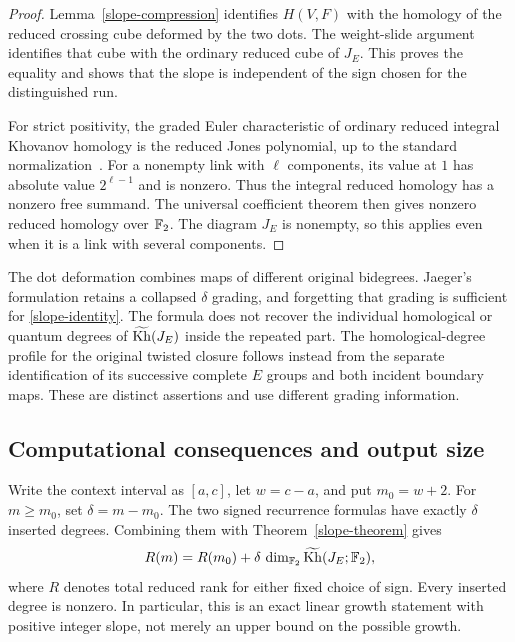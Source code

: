 \begin{proof}
Lemma~\ref{slope-compression} identifies $H(V,F)$ with the homology of the
reduced crossing cube deformed by the two dots. The weight-slide argument
identifies that cube with the ordinary reduced cube of $J_E$. This proves
the equality and shows that the slope is independent of the sign chosen
for the distinguished run.

For strict positivity, the graded Euler characteristic of ordinary reduced
integral Khovanov homology is the reduced Jones polynomial, up to the
standard normalization~\cite{bn05}. For a nonempty link with $\ell$
components, its value at $1$ has absolute value $2^{\ell-1}$ and is
nonzero. Thus the integral reduced homology has a nonzero free summand.
The universal coefficient theorem then gives nonzero reduced homology
over $\mathbb F_2$. The diagram $J_E$ is nonempty, so this applies even when it is
a link with several components.
\end{proof}

\begin{remark}\label{slope-grading}
The dot deformation combines maps of different original bidegrees.
Jaeger's formulation retains a collapsed $\delta$ grading, and forgetting
that grading is sufficient for \eqref{slope-identity}. The formula does
not recover the individual homological or quantum degrees of $\widetilde{\operatorname{Kh}}(J_E)$
inside the repeated part. The homological-degree profile for the original
twisted closure follows instead from the separate identification of its
successive complete $E$ groups and both incident boundary maps. These are
distinct assertions and use different grading information.
\end{remark}

\subsection{Computational consequences and output size}

Write the context interval as $[a,c]$, let $w=c-a$, and put $m_0=w+2$.
For $m\ge m_0$, set $\delta=m-m_0$. The two signed recurrence formulas
have exactly $\delta$ inserted degrees. Combining them with
Theorem~\ref{slope-theorem} gives
\begin{equation}\label{slope-rank-growth}
 R(m)=R(m_0)+\delta\,\dim_{\mathbb F_2}\widetilde{\operatorname{Kh}}(J_E;\mathbb F_2),
\end{equation}
where $R$ denotes total reduced rank for either fixed choice of sign.
Every inserted degree is nonzero. In particular, this is an exact linear
growth statement with positive integer slope, not merely an upper bound
on the possible growth.

